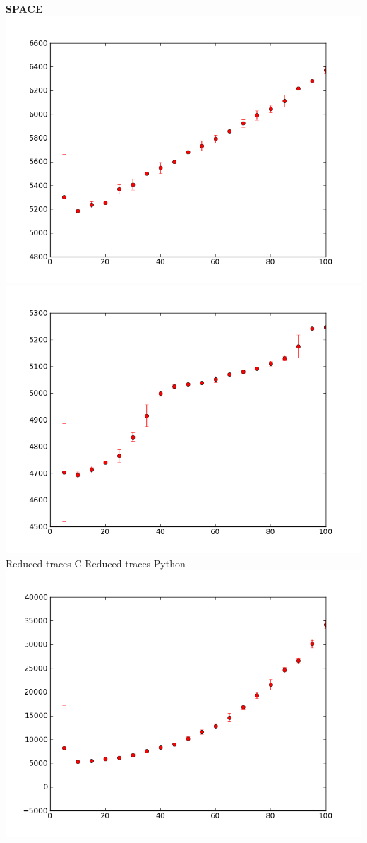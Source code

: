 \documentclass[10pt]{article}
\begin{document}
\begin{center}
{\bf SPACE} \\
\includegraphics[scale=0.4]{../graphs/categorical/categorical-reduced-c-space.png}
\includegraphics[scale=0.4]{../graphs/categorical/categorical-reduced-py-space.png} \\
Reduced traces C \qquad \qquad \qquad\qquad\qquad\qquad \qquad Reduced traces Python \\
\includegraphics[scale=0.4]{../graphs/categorical/categorical-traces-c-space.png}

\end{center}
\end{document}
